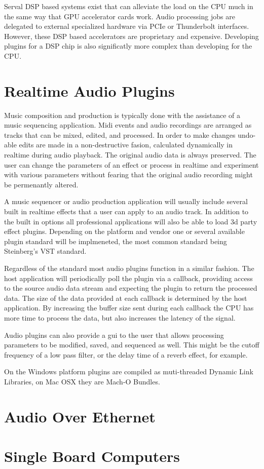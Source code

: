 Serval DSP based systems exist that can alleviate the load on the CPU much in the same way that GPU accelerator cards work. Audio processing jobs are delegated to external specialized hardware via PCIe or Thunderbolt interfaces. However, these DSP based accelerators are proprietary and expensive. Developing plugins for a DSP chip is also significatly more complex than developing for the CPU.

\section{Realtime Audio Plugins}

Music composition and production is typically done with the assistance of a music sequencing application. Midi events
 and audio recordings are arranged as tracks that can be mixed, edited, and processed. In order to make changes
 undo-able edits are made in a non-destructive fasion, calculated dynamically in realtime during audio playback. The
 original audio data is always preserved. The user can change the parameters of an effect or process in realtime and
 experiment with various parameters without fearing that the original audio recording might be permenantly altered.

A music sequencer or audio production application will usually include several built in realtime effects that a user
can apply to an audio track. In addition to the built in options all professional applications will also be able to
load 3d party effect plugins. Depending on the platform and vendor one or several available plugin standard will be
implmeneted, the most common standard being Steinberg's VST standard.

Regardless of the standard most audio plugins function in a similar fashion. The host application will periodically
poll the plugin via a callback, providing access to the source audio data stream and expecting the plugin to return the
 processed data. The size of the data provided at each callback is determined by the host application. By increasing the
 buffer size sent during each callback the CPU has more time to process the data, but also increases the latency of
 the signal.

 Audio plugins can also provide a gui to the user that allows processing parameters to be modified, saved, and
 sequenced as well. This might be the cutoff frequency of a low pass filter, or the delay time of a reverb effect,
 for example.

 On the Windows platform plugins are compiled as muti-threaded Dynamic Link Libraries, on Mac OSX they are Mach-O
 Bundles.

\section{Audio Over Ethernet}

\section{Single Board Computers}